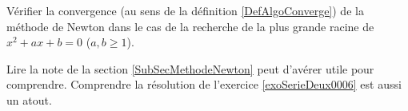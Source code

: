 
\begin{exercice}\label{exoSerieTrois0004}

	Vérifier la convergence (au sens de la définition \ref{DefAlgoConverge}) de la méthode de Newton dans le cas de la recherche de la plus grande racine de $x^2+ax+b=0$ ($a,b\geq1$).

	Lire la note de la section \ref{SubSecMethodeNewton} peut d'avérer utile pour comprendre. Comprendre la résolution de l'exercice \ref{exoSerieDeux0006} est aussi un atout.

\end{exercice}
